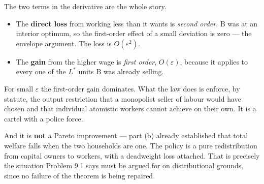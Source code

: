 \documentclass[12pt, letterpaper]{article}
\newcommand{\stst}{^{\ast}}
\begin{document}
\begin{tcolorbox}[evenbox,title={Problem 9.4 \quad Pro-Worker Policies}]
\begin{tcolorbox}[theorybox,title={The economics: B is being handed monopoly power}]
The two terms in the derivative are the whole story.
\begin{itemize}
\item The \textbf{direct loss} from working less than it wants is \emph{second order}. B was at
an interior optimum, so the first-order effect of a small deviation is zero --- the envelope
argument. The loss is $O(\varepsilon^2)$.
\item The \textbf{gain} from the higher wage is \emph{first order}, $O(\varepsilon)$, because
it applies to every one of the $L\stst$ units B was already selling.
\end{itemize}
For small $\varepsilon$ the first-order gain dominates. What the law does is enforce, by
statute, the output restriction that a monopolist seller of labour would have chosen and that
individual atomistic workers cannot achieve on their own. It is a cartel with a police force.

\smallskip
And it is \textbf{not} a Pareto improvement --- part (b) already established that total welfare
falls when the two households are one. The policy is a pure redistribution from capital owners
to workers, with a deadweight loss attached. That is precisely the situation Problem 9.1 says
must be argued for on distributional grounds, since no failure of the theorem is being repaired.
\end{tcolorbox}
\end{tcolorbox}
\end{document}
